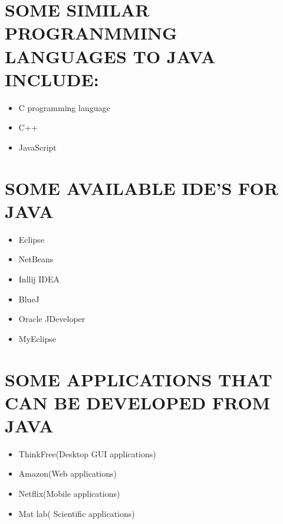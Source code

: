 \documentclass{article}
\begin{document}
	\section{SOME SIMILAR PROGRANMMING LANGUAGES TO JAVA INCLUDE:}
	\begin{itemize}
	\item C programming language
	\item C++
	\item JavaScript
   \end{itemize}
	\section{SOME AVAILABLE IDE’S FOR JAVA}
	\begin{itemize}
	\item Eclipse
	\item NetBeans
	\item Inllij IDEA
	\item BlueJ
	\item Oracle JDeveloper
	\item MyEclipse
\end{itemize}
	\section{SOME APPLICATIONS THAT CAN BE DEVELOPED FROM JAVA}
	\begin{itemize}
	\item ThinkFree(Desktop GUI applications)
	\item Amazon(Web applications)
	\item Netflix(Mobile applications)
	\item Mat lab( Scientific applications)
	\end{itemize}
	
\end{document}
